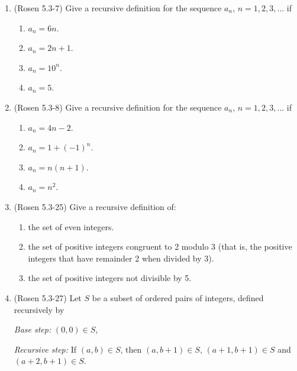 \begin{enumerate}

\item (Rosen 5.3-7) Give a recursive definition for the sequence
${a_n}$, $n=1,2,3,...$ if

\begin{enumerate}
\item \streasy $a_{n} = 6n$.

\item \strmedium $a_{n} = 2n+1$.

\item \strmedium $a_{n} = 10^{n}$.

\item \streasy $a_{n} = 5$.

\end{enumerate}

\item (Rosen 5.3-8) Give a recursive definition for the sequence
${a_n}$, $n=1,2,3,...$ if
\begin{enumerate}
\item \streasy $a_{n} = 4n-2$.

\item \strmedium $a_{n} = 1+(-1)^n$.

\item \strmedium $a_{n} = n(n+1)$.

\item \streasy $a_{n} = n^2$.
\end{enumerate}

\item (Rosen 5.3-25) Give a recursive definition of:

\begin{enumerate}
\item \streasy the set of even integers.


\item \streasy the set of positive integers congruent to 2 modulo 3 
(that is, the positive integers that have remainder 2 when divided by 3).

\item \strmedium the set of positive integers not divisible by 5.
\end{enumerate} 

\item (Rosen 5.3-27) Let $S$ be a subset of ordered pairs 
of integers, defined recursively by

\emph{Base step:} $(0,0)\in S$,

\emph{Recursive step:} If $(a,b)\in S$, then $(a,b+1)\in S$, 
$(a+1,b+1)\in S$ and $(a+2, b+1) \in S$.


\end{enumerate}
